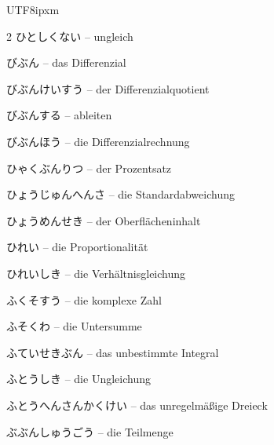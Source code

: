 \begin{CJK}{UTF8}{ipxm}
\begin{multicols}{2}
 {\footnotesize\color{black!70}ひとしくない} -- ungleich\dotfill\hyperref[e:61]{\pageref*{e:61}}\par
{} {\footnotesize\color{black!70}びぶん} -- das Differenzial\dotfill\hyperref[e:276]{\pageref*{e:276}}\par
{} {\footnotesize\color{black!70}びぶんけいすう} -- der Differenzialquotient\dotfill\hyperref[e:275]{\pageref*{e:275}}\par
{} {\footnotesize\color{black!70}びぶんする} -- ableiten\dotfill\hyperref[e:278]{\pageref*{e:278}}\par
{} {\footnotesize\color{black!70}びぶんほう} -- die Differenzialrechnung\dotfill\hyperref[e:274]{\pageref*{e:274}}\par
{} {\footnotesize\color{black!70}ひゃくぶんりつ} -- der Prozentsatz\dotfill\hyperref[e:58]{\pageref*{e:58}}\par
{} {\footnotesize\color{black!70}ひょうじゅんへんさ} -- die Standardabweichung\dotfill\hyperref[e:337]{\pageref*{e:337}}\par
{} {\footnotesize\color{black!70}ひょうめんせき} -- der Oberflächeninhalt\dotfill\hyperref[e:256]{\pageref*{e:256}}\par
{} {\footnotesize\color{black!70}ひれい} -- die Proportionalität\dotfill\hyperref[e:94]{\pageref*{e:94}}\par
{} {\footnotesize\color{black!70}ひれいしき} -- die Verhältnisgleichung\dotfill\hyperref[e:41]{\pageref*{e:41}}\par
{} {\footnotesize\color{black!70}ふくそすう} -- die komplexe Zahl\dotfill\hyperref[e:10]{\pageref*{e:10}}\par
{} {\footnotesize\color{black!70}ふそくわ} -- die Untersumme\dotfill\hyperref[e:294]{\pageref*{e:294}}\par
{} {\footnotesize\color{black!70}ふていせきぶん} -- das unbestimmte Integral\dotfill\hyperref[e:287]{\pageref*{e:287}}\par
{} {\footnotesize\color{black!70}ふとうしき} -- die Ungleichung\dotfill\hyperref[e:77]{\pageref*{e:77}}\par
{} {\footnotesize\color{black!70}ふとうへんさんかくけい} -- das unregelmäßige Dreieck\dotfill\hyperref[e:180]{\pageref*{e:180}}\par
{} {\footnotesize\color{black!70}ぶぶんしゅうごう} -- die Teilmenge\dotfill\hyperref[e:98]{\pageref*{e:98}}\par

\end{multicols}
\end{CJK}
